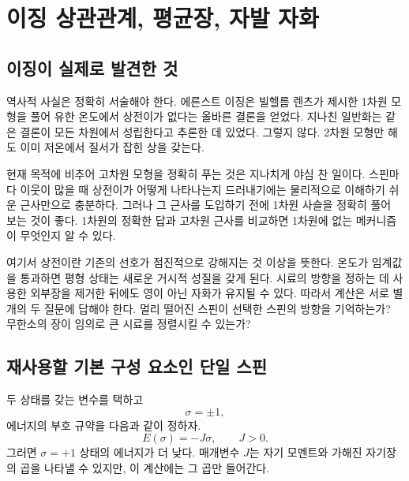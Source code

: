 \chapter{이징 상관관계, 평균장, 자발 자화}


\section{이징이 실제로 발견한 것}

역사적 사실은 정확히 서술해야 한다. 에른스트 이징은 빌헬름 렌츠가 제시한 1차원 모형을 풀어 유한 온도에서 상전이가 없다는 올바른 결론을 얻었다. 지나친 일반화는 같은 결론이 모든 차원에서 성립한다고 추론한 데 있었다. 그렇지 않다. 2차원 모형만 해도 이미 저온에서 질서가 잡힌 상을 갖는다.

현재 목적에 비추어 고차원 모형을 정확히 푸는 것은 지나치게 야심 찬 일이다. 스핀마다 이웃이 많을 때 상전이가 어떻게 나타나는지 드러내기에는 물리적으로 이해하기 쉬운 근사만으로 충분하다. 그러나 그 근사를 도입하기 전에 1차원 사슬을 정확히 풀어 보는 것이 좋다. 1차원의 정확한 답과 고차원 근사를 비교하면 1차원에 없는 메커니즘이 무엇인지 알 수 있다.

여기서 상전이란 기존의 선호가 점진적으로 강해지는 것 이상을 뜻한다. 온도가 임계값을 통과하면 평형 상태는 새로운 거시적 성질을 갖게 된다. 시료의 방향을 정하는 데 사용한 외부장을 제거한 뒤에도 영이 아닌 자화가 유지될 수 있다. 따라서 계산은 서로 별개의 두 질문에 답해야 한다. 멀리 떨어진 스핀이 선택한 스핀의 방향을 기억하는가? 무한소의 장이 임의로 큰 시료를 정렬시킬 수 있는가?

\section{재사용할 기본 구성 요소인 단일 스핀}

두 상태를 갖는 변수를 택하고
\begin{equation}
\sigma=\pm1,
\end{equation}
에너지의 부호 규약을 다음과 같이 정하자.
\begin{equation}
E(\sigma)=-J\sigma,
\qquad J>0.
\end{equation}
그러면 \(\sigma=+1\) 상태의 에너지가 더 낮다. 매개변수 \(J\)는 자기 모멘트와 가해진 자기장의 곱을 나타낼 수 있지만, 이 계산에는 그 곱만 들어간다.

